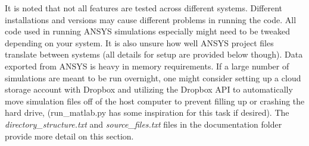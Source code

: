 \documentclass[11pt,letterpaper]{article}
\begin{document}
		It is noted that not all features are tested across different systems. Different installations and versions may cause different problems in running the code. All code used in running ANSYS simulations especially might need to be tweaked depending on your system. It is also unsure how well ANSYS project files translate between systems (all details for setup are provided below though). Data exported from ANSYS is heavy in memory requirements. If a large number of simulations are meant to be run overnight, one might consider setting up a cloud storage account with Dropbox and utilizing the Dropbox API to automatically move simulation files off of the host computer to prevent filling up or crashing the hard drive, (run\_matlab.py has some inspiration for this task if desired). The \textit{directory\_structure.txt} and \textit{source\_files.txt} files in the documentation folder provide more detail on this section.
\end{document}
